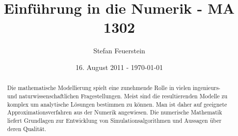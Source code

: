 \documentclass[10pt,a4paper]{article}
\author{Stefan Feuerstein}
\title {Einführung in die Numerik - MA 1302}
\date  {16. August 2011 - \today}
\theoremstyle{definition} \newtheorem{definition}{Definition}[section]
\theoremstyle{remark}     \newtheorem*{bemerkung}{\textbf{Bemerkung}} %
\begin{document}
\maketitle

\begin{abstract}
\noindent Die mathematische Modellierung spielt eine zunehmende Rolle in vielen
ingenieurs- und naturwissenschaftlichen Fragestellungen.  Meist sind die
resultierenden Modelle zu komplex um analytische Lösungen bestimmen zu können.
Man ist daher auf geeignete Approximationsverfahren aus der Numerik angewiesen.
Die numerische Mathematik liefert Grundlagen zur Entwicklung von
Simulationsalgorithmen und Aussagen über deren Qualität.
\end{abstract}

\tableofcontents
\pagebreak




\pagebreak
\listofalgorithms
\end{document}
